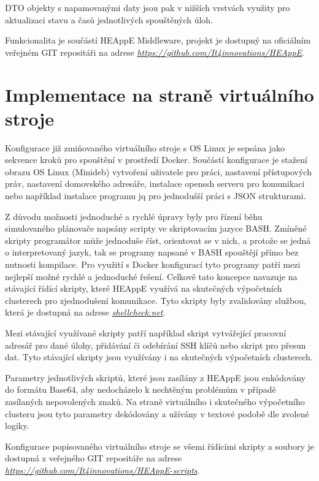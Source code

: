 DTO objekty s napamovanými daty jsou pak v nižších vrstvách využity pro aktualizaci stavu a časů jednotlivých spouštěných úloh.

Funkcionalita je součástí HEAppE Middleware, projekt je dostupný na oficiálním veřejném GIT repositáři na adrese \emph{\href{https://github.com/It4innovations/HEAppE}{https://github.com/It4innovations/HEAppE}}.

\section{Implementace na straně virtuálního stroje}
Konfigurace již zmiňovaného virtuálního stroje s OS Linux je sepsána jako sekvence kroků pro spouštění v prostředí Docker. Součástí konfigurace je stažení obrazu OS Linux (Minideb) vytvoření uživatele pro práci, nastavení přístupových práv, nastavení domovského adresáře, instalace openssh serveru pro komunikaci nebo například instalace programu jq pro jednodušší práci s JSON strukturami.

Z důvodu možnosti jednoduché a rychlé úpravy byly pro řízení běhu simulovaného plánovače napsány scripty ve skriptovacím jazyce BASH. Zmíněné skripty programátor může jednoduše číst, orientovat se v nich, a protože se jedná o interpretovaný jazyk, tak se programy napsané v BASH spouštějí přímo bez nutnosti kompilace. Pro využití s Docker konfigurací tyto programy patří mezi nejlepší možné rychlé a jednoduché řešení. Celkově tato koncepce navazuje na stávající řídící skripty, které HEAppE využívá na skutečných výpočetních clusterech pro zjednodušení komunikace. Tyto skripty byly zvalidovány službou, která je dostupná na adrese \emph{\href{https://www.shellcheck.net/}{shellcheck.net}}.

Mezi stávající využívané skripty patří například skript vytvářející pracovní adresář pro dané úlohy, přidávání či odebírání SSH klíčů nebo skript pro přesun dat. Tyto stávající skripty jsou využívány i na skutečných výpočetních clusterech.

Parametry jednotlivých skriptů, které jsou zasílány z HEAppE jsou enkódovány do formátu Base64, aby nedocházelo k nechtěným problémům v případě zasílaných nepovolených znaků. Na straně virtuálního i skutečného výpočetního clusteru jsou tyto parametry dekódovány a užívány v textové podobě dle zvolené logiky.

Konfigurace popisovaného virtuálního stroje se všemi řídícími skripty a soubory je dostupná z veřejného GIT repositáře na adrese \emph{\href{https://github.com/It4innovations/HEAppE-scripts}{https://github.com/It4innovations/HEAppE-scripts}}.



